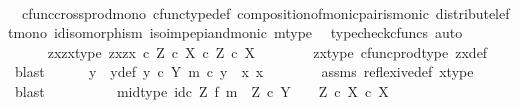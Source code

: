 \begin{isabellebody}
\ \ \ \ \ \ \isamarkupfalse%
\ \ cfunc{\isacharunderscore}{\kern0pt}cross{\isacharunderscore}{\kern0pt}prod{\isacharunderscore}{\kern0pt}mono\ cfunc{\isacharunderscore}{\kern0pt}type{\isacharunderscore}{\kern0pt}def\ composition{\isacharunderscore}{\kern0pt}of{\isacharunderscore}{\kern0pt}monic{\isacharunderscore}{\kern0pt}pair{\isacharunderscore}{\kern0pt}is{\isacharunderscore}{\kern0pt}monic\ distribute{\isacharunderscore}{\kern0pt}left{\isacharunderscore}{\kern0pt}mono\ id{\isacharunderscore}{\kern0pt}isomorphism\ iso{\isacharunderscore}{\kern0pt}imp{\isacharunderscore}{\kern0pt}epi{\isacharunderscore}{\kern0pt}and{\isacharunderscore}{\kern0pt}monic\ m{\isacharunderscore}{\kern0pt}type\ \isamarkupfalse%
\ {\isacharparenleft}{\kern0pt}typecheck{\isacharunderscore}{\kern0pt}cfuncs{\isacharcomma}{\kern0pt}\ auto{\isacharparenright}{\kern0pt}\isanewline
\ \ \isamarkupfalse%
\isanewline
\ \ \ \ \isamarkupfalse%
\ zxzx{\isacharunderscore}{\kern0pt}type{\isacharcolon}{\kern0pt}\ {\isachardoublequoteopen}{\isasymlangle}{\isasymlangle}z{\isacharcomma}{\kern0pt}x{\isasymrangle}{\isacharcomma}{\kern0pt}{\isasymlangle}z{\isacharcomma}{\kern0pt}x{\isasymrangle}{\isasymrangle}\ {\isasymin}\isactrlsub c\ {\isacharparenleft}{\kern0pt}Z\ {\isasymtimes}\isactrlsub c\ X{\isacharparenright}{\kern0pt}\ {\isasymtimes}\isactrlsub c\ Z\ {\isasymtimes}\isactrlsub c\ X{\isachardoublequoteclose}\isanewline
\ \ \ \ \ \ \isamarkupfalse%
\ zx{\isacharunderscore}{\kern0pt}type\ cfunc{\isacharunderscore}{\kern0pt}prod{\isacharunderscore}{\kern0pt}type\ zx{\isacharunderscore}{\kern0pt}def\ \isamarkupfalse%
\ blast\isanewline
\ \ \ \ \isamarkupfalse%
\ y\ \ y{\isacharunderscore}{\kern0pt}def{\isacharcolon}{\kern0pt}\ {\isachardoublequoteopen}y\ {\isasymin}\isactrlsub c\ Y{\isachardoublequoteclose}\ {\isachardoublequoteopen}m\ {\isasymcirc}\isactrlsub c\ y\ {\isacharequal}{\kern0pt}\ {\isasymlangle}x{\isacharcomma}{\kern0pt}\ x{\isasymrangle}{\isachardoublequoteclose}\isanewline
\ \ \ \ \ \ \isamarkupfalse%
\ assms\ reflexive{\isacharunderscore}{\kern0pt}def{}\ x{\isacharunderscore}{\kern0pt}type\ \isamarkupfalse%
\ blast\isanewline
\ \ \ \ \ \ \ \ \isamarkupfalse%
\ mid{\isacharunderscore}{\kern0pt}type{\isacharcolon}{\kern0pt}\ {\isachardoublequoteopen}{\isacharparenleft}{\kern0pt}id\isactrlsub c\ Z\ {\isasymtimes}\isactrlsub f\ m{\isacharparenright}{\kern0pt}\ {\isacharcolon}{\kern0pt}\ Z\ {\isasymtimes}\isactrlsub c\ Y\ {\isasymrightarrow}\ \ \ Z\ {\isasymtimes}\isactrlsub c\ {\isacharparenleft}{\kern0pt}X\ {\isasymtimes}\isactrlsub c\ X{\isacharparenright}{\kern0pt}{\isachardoublequoteclose}\isanewline

\end{isabellebody}
